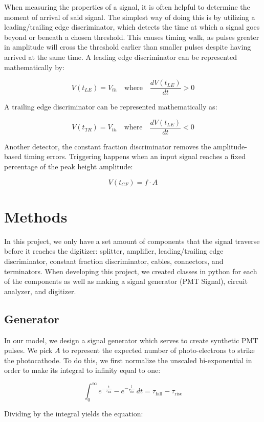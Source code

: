 \documentclass[10pt]{article}
\begin{document}
When measuring the properties of a signal, it is often helpful to determine the moment of arrival of said signal. The simplest way of doing this is by utilizing a leading/trailing edge discriminator, which detects the time at which a signal goes beyond or beneath a chosen threshold. This causes timing walk, as pulses greater in amplitude will cross the threshold earlier than smaller pulses despite having arrived at the same time. A leading edge discriminator can be represented mathematically by:  

$$
V(t_{LE}) = V_{th} \quad \text{where} \quad \frac{dV(t_{LE})}{dt} > 0
$$

A trailing edge discriminator can be represented mathematically as: 

$$
V(t_{TR}) = V_{th} \quad \text{where} \quad \frac{dV(t_{LE})}{dt} < 0
$$

Another detector, the constant fraction discriminator removes the amplitude-based timing errors. Triggering happens when an input signal reaches a fixed percentage of the peak height amplitude:

$$
V(t_{CF}) = f\cdot A
$$

\section{Methods}
In this project, we only have a set amount of components that the signal traverse before it reaches the digitizer: splitter, amplifier, leading/trailing edge discriminator, constant fraction discriminator, cables, connectors, and terminators.
When developing this project, we created classes in python for each of the components as well as making a signal generator (PMT Signal), circuit analyzer, and digitizer.

\subsection{Generator}
In our model, we design a signal generator which serves to create synthetic PMT pulses. We pick $A$ to represent the expected number of photo-electrons to strike the photocathode. To do this, we first normalize the unscaled bi-exponential in order to make its integral to infinity equal to one: 

$$
\int_{0}^{\infty} e^{-\frac{t}{\tau_{\text{fall}}}} - e^{-\frac{t}{\tau_{\text{rise}}}} \,dt = \tau_{\text{fall}} - \tau_{\text{rise}}  
$$

Dividing by the integral yields the equation: 
\end{document}
